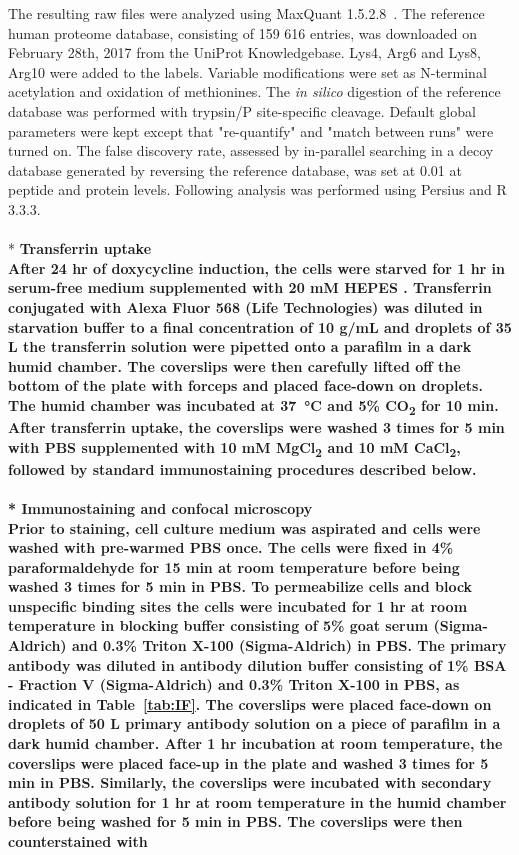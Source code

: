 The resulting raw files were analyzed using MaxQuant 1.5.2.8~\cite{Cox}. The reference human proteome database, consisting of 159 616 entries, was downloaded on February 28th, 2017 from the UniProt Knowledgebase. Lys4, Arg6 and Lys8, Arg10 were added to the labels. Variable modifications were set as N-terminal acetylation and oxidation of methionines. The \textit{in silico} digestion of the reference database was performed with trypsin/P site-specific cleavage. Default global parameters were kept except that "re-quantify" and "match between runs" were turned on. The false discovery rate, assessed by in-parallel searching in a decoy database generated by reversing the reference database, was set at 0.01 at peptide and protein levels. Following analysis was performed using Persius and R 3.3.3.
\\
\\*
\bfseries{Transferrin uptake}\\
\normalfont After 24 hr of doxycycline induction, the cells were starved for 1 hr in serum-free medium supplemented with 20 mM HEPES
. Transferrin conjugated with Alexa Fluor 568 (Life Technologies) was diluted in starvation buffer to a final concentration of 10 {}\textmu g/mL and droplets of 35 {}\textmu L the transferrin solution were pipetted onto a parafilm in a dark humid chamber. The coverslips were then carefully lifted off the bottom of the plate with forceps and placed face-down on droplets. The humid chamber was incubated at \SI{37}{\celsius} and 5\% CO\textsubscript{2} for 10 min. After transferrin uptake, the coverslips were washed 3 times for 5 min with PBS supplemented with 10 mM MgCl\textsubscript{2} and 10 mM CaCl\textsubscript{2}, followed by standard immunostaining procedures described below.
\\
\\*
\bfseries{Immunostaining and confocal microscopy}\\
\normalfont Prior to staining, cell culture medium was aspirated and cells were washed with pre-warmed PBS once. The cells were fixed in 4\% paraformaldehyde for 15 min at room temperature before being washed 3 times for 5 min in PBS. To permeabilize cells and block unspecific binding sites the cells were incubated for 1 hr at room temperature in blocking buffer consisting of 5\% goat serum (Sigma-Aldrich) and 0.3\% Triton X-100 (Sigma-Aldrich) in PBS. The primary antibody was diluted in antibody dilution buffer consisting of 1\% BSA - Fraction V (Sigma-Aldrich) and 0.3\% Triton X-100 in PBS, as indicated in Table~\ref{tab:IF}. The coverslips were placed face-down on droplets of 50 {}\textmu L primary antibody solution on a piece of parafilm in a dark humid chamber. After 1 hr incubation at room temperature, the coverslips were placed face-up in the plate and washed 3 times for 5 min in PBS. Similarly, the coverslips were incubated with secondary antibody solution for 1 hr at room temperature in the humid chamber before being washed for 5 min in PBS. The coverslips were then counterstained with 
